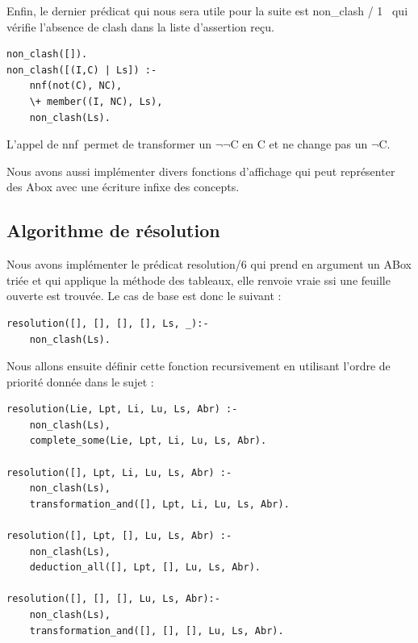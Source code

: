 \documentclass{article}
\begin{document}
Enfin, le dernier prédicat qui nous sera utile pour la suite est \color{blue} non\_clash / 1 \color{black}\ qui vérifie l'absence de clash dans la liste d'assertion reçu.
\begin{verbatim}
non_clash([]).
non_clash([(I,C) | Ls]) :-
    nnf(not(C), NC),
    \+ member((I, NC), Ls),
    non_clash(Ls).
\end{verbatim}
L'appel de \color{blue}nnf\color{black}\ permet de transformer un $\neg\neg$C en C et ne change pas un $\neg$C.

Nous avons aussi implémenter divers fonctions d'affichage qui peut représenter des Abox avec une écriture infixe des concepts.
\subsection{Algorithme de résolution}
Nous avons implémenter le prédicat resolution/6 qui prend en argument un ABox triée et qui applique la méthode des tableaux, elle renvoie vraie ssi une feuille ouverte est trouvée. Le cas de base est donc le suivant :
\begin{verbatim}
resolution([], [], [], [], Ls, _):-
	non_clash(Ls).
\end{verbatim}

Nous allons ensuite définir cette fonction recursivement en utilisant l'ordre de priorité donnée dans le sujet :
\begin{verbatim}
resolution(Lie, Lpt, Li, Lu, Ls, Abr) :-
    non_clash(Ls),
    complete_some(Lie, Lpt, Li, Lu, Ls, Abr).
	
resolution([], Lpt, Li, Lu, Ls, Abr) :-
    non_clash(Ls),
    transformation_and([], Lpt, Li, Lu, Ls, Abr).
	
resolution([], Lpt, [], Lu, Ls, Abr) :-
    non_clash(Ls),
    deduction_all([], Lpt, [], Lu, Ls, Abr).
	
resolution([], [], [], Lu, Ls, Abr):-
	non_clash(Ls),
	transformation_and([], [], [], Lu, Ls, Abr).
\end{verbatim}
\end{document}
